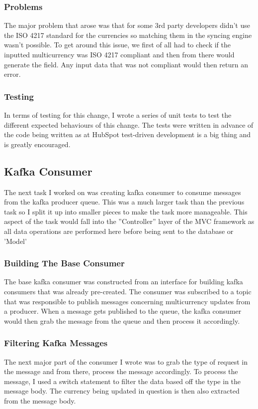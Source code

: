 \subsubsection{Problems} 
The major problem that arose was that for some 3rd party developers didn't use the ISO 4217 standard for the currencies so matching them in the syncing engine wasn't possible.  \newline To get around this issue,  we first of all had to check if the inputted multicurrency was ISO 4217 compliant and then from there would generate the field.  Any input data that was not compliant would then return an error.

\subsubsection{Testing}
In terms of testing for this change,  I wrote a series of unit tests to test the different expected behaviours of this change.  The tests were written in advance of the code being written as at HubSpot test-driven development is a big thing and is greatly encouraged. 

\subsection{Kafka Consumer}
The next task I worked on was creating kafka consumer to consume messages from the kafka producer queue. This was a much larger task than the previous task so I split it up into smaller pieces to make the task more manageable. This aspect of the task would fall into the ''Controller'' layer of the MVC framework as all data operations are performed here before being sent to the database or 'Model'

\subsubsection{Building The Base Consumer}
The base kafka consumer was constructed from an interface for building kafka consumers that was already pre-created. The consumer was subscribed to a topic that was responsible to publish messages concerning multicurrency updates from a producer. When a message gets published to the queue, the kafka consumer would then grab the message from the queue and then process it accordingly. 

\subsubsection{Filtering Kafka Messages}
The next major part of the consumer I wrote was to grab the type of request in the message and from there, process the message accordingly. To process the message, I used a switch statement to filter the data based off the type in the message body. The currency being updated in question is then also extracted from the message body.

